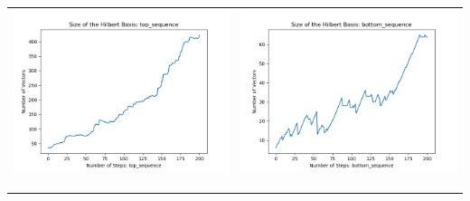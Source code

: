 \documentclass[10pt]{article}
\begin{document}
\begin{tabular}{c|c}
\begin{minipage}{.4\textwidth}
\includegraphics[width=\textwidth]{"DATA/5d/6 generators 2 bound B/top_sequence SIZE"}
\end{minipage} &
\begin{minipage}{.4\textwidth}
\includegraphics[width=\textwidth]{"DATA/5d/6 generators 2 bound B bottomup/bottom_sequence SIZE"}
\end{minipage} \\ \\
\hline \\\begin{minipage}{.4\textwidth}

\end{minipage}
\end{tabular}
\end{document}
